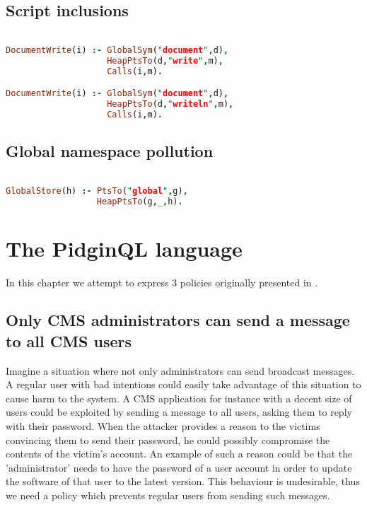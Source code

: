 \subsection{Script inclusions}

\begin{lstlisting}[label={lst:Policy2GK},language=Prolog,caption=Policy 2 in GateKeeper,mathescape=true]  % float=t?

DocumentWrite(i) :- GlobalSym("document",d),
                    HeapPtsTo(d,"write",m),
                    Calls(i,m).

DocumentWrite(i) :- GlobalSym("document",d),
                    HeapPtsTo(d,"writeln",m),
                    Calls(i,m).
\end{lstlisting}

\subsection{Global namespace pollution}

\begin{lstlisting}[label={lst:Policy3GK},language=Prolog,caption=Policy 3 in GateKeeper,mathescape=true]  % float=t?

GlobalStore(h) :- PtsTo("global",g),
                  HeapPtsTo(g,_,h).
\end{lstlisting}

\section{The PidginQL language}
\label{sec:ValidationPidginQL}

In this chapter we attempt to express 3 policies originally presented in \cite{PidginQLTechReport}.

\subsection{Only CMS administrators can send a message to all CMS users}
Imagine a situation where not only administrators can send broadcast messages. A regular user with bad intentions could easily take advantage of this situation to cause harm to the system. A CMS application for instance with a decent size of users could be exploited by sending a message to all users, asking them to reply with their password. When the attacker provides a reason to the victims convincing them to send their password, he could possibly compromise the contents of the victim's account. An example of such a reason could be that the 'administrator' needs to have the password of a user account in order to update the software of that user to the latest version. This behaviour is undesirable, thus we need a policy which prevents regular users from sending such messages.

